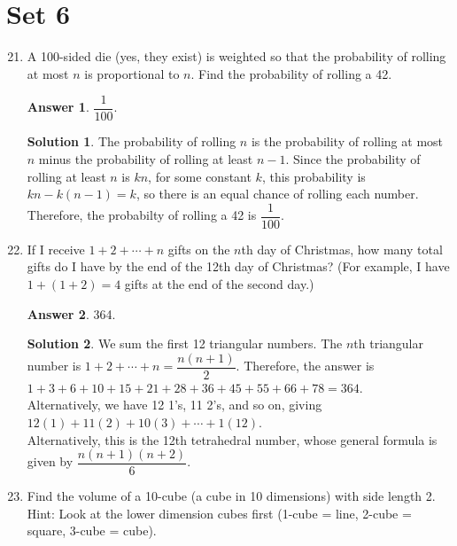 \documentclass[11pt]{article}
\theoremstyle{definition}
\newtheorem*{solution}{Solution}
\newtheorem*{answer}{Answer}
\begin{document}
\section*{Set 6}
\begin{enumerate}
\setcounter{enumi}{20}

\item A 100-sided die (yes, they exist) is weighted so that the probability of rolling at most $n$ is proportional to $n$. Find the probability of rolling a 42.

\begin{answer}
$\dfrac{1}{100}$.
\end{answer}
\begin{solution} The probability of rolling $n$ is the probability of rolling at most $n$ minus the probability of rolling at least $n-1$. Since the probability of rolling at least $n$ is $kn$, for some constant $k$, this probability is $kn - k(n-1) = k$, so there is an equal chance of rolling each number. Therefore, the probabilty of rolling a 42 is $\boxed{\dfrac{1}{100}}$.

\end{solution}

\item If I receive $1 + 2 + \cdots + n$ gifts on the $n$th day of Christmas, how many total gifts do I have by the end of the 12th day of Christmas? (For example, I have $1+(1+2)=4$ gifts at the end of the second day.) %

\begin{answer}
364.
\end{answer}
\begin{solution} We sum the first 12 triangular numbers. The $n$th triangular number is $1 + 2 + \cdots + n = \dfrac{n(n+1)}{2}$. Therefore, the answer is $1+3+6+10+15+21+28+36+45+55+66+78 = \boxed{364}$.\\
Alternatively, we have 12 1's, 11 2's, and so on, giving $12(1) + 11(2) + 10(3) + \cdots + 1(12)$.\\
Alternatively, this is the 12th tetrahedral number, whose general formula is given by $\dfrac{n(n+1)(n+2)}{6}$.

\end{solution}

\item Find the volume of a 10-cube (a cube in 10 dimensions) with side length 2. \\
Hint: Look at the lower dimension cubes first (1-cube = line, 2-cube = square, 3-cube = cube).


\end{enumerate}
\end{document}

